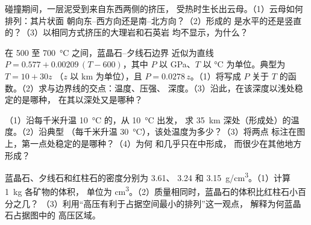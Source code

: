 \begin{exercise}[$\star\star$]\label{exo:g12:metamorphic-rocks:11}
碰撞期间，一层泥受到来自东西两侧的挤压，
受热时生长出云母。（1）云母如何排列：其片状面
朝向东–西方向还是南–北方向？（2）形成的
是水平的还是竖直的？（3）以相同方式挤压的大理岩和石英岩
均不显示，为什么？
\end{exercise}

\begin{exercise}[$\star\star\star$]\label{exo:g12:metamorphic-rocks:12}
在 500 至 \qty{700}{\celsius} 之间，蓝晶石–夕线石边界
近似为直线 $P = 0.577 + 0.00209\,(T - 600)$，其中 $P$ 以
\unit{GPa}、$T$ 以 \unit{\celsius} 为单位。典型为 $T = 10 + 30z$
（$z$ 以 \unit{km} 为单位），且 $P = 0.0278\,z$。（1）将写成 $P$ 关于
$T$ 的函数。（2）求与边界线的交点：温度、压强、
深度。（3）沿此，在该深度以浅处稳定的是哪种，
在其以深处又是哪种？
\end{exercise}

\begin{exercise}[$\star\star\star$]\label{exo:g12:metamorphic-rocks:13}
（1）沿每千米升温 \qty{10}{\celsius} 的，从 \qty{10}{\celsius} 出发，
求 \qty{35}{km} 深处（形成处）的温度。（2）沿典型
（每千米升温 \qty{30}{\celsius}），该处温度为多少？（3）将两点
标注在图上，第一点处稳定的是哪种？（4）为何
和几乎只在中形成，
而很少在其他地方形成？
\end{exercise}

\begin{exercise}[$\star\star\star$]\label{exo:g12:metamorphic-rocks:14}
蓝晶石、夕线石和红柱石的密度分别为 \num{3.61}、
\num{3.24} 和 \qty{3.15}{g/cm^3}。（1）计算 \qty{1}{kg} 各矿物的体积，
单位为 \unit{cm^3}。（2）质量相同时，蓝晶石的体积比红柱石小百分之几？
（3）利用“高压有利于占据空间最小的排列”这一观点，
解释为何蓝晶石占据图中的
高压区域。
\end{exercise}

